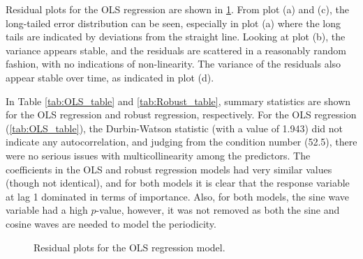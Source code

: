 \label{chapt:appendix_B}
Residual plots for the OLS regression are shown in \cref{fig:residuals_MLR}. From plot (a) and (c), the long-tailed error distribution can be seen, especially in plot (a) where the long tails are indicated by deviations from the straight line. Looking at plot (b), the variance appears stable, and the residuals are scattered in a reasonably random fashion, with no indications of non-linearity. The variance of the residuals also appear stable over time, as indicated in plot (d). 

In Table \ref{tab:OLS_table} and \ref{tab:Robust_table}, summary statistics are shown for the OLS regression and robust regression, respectively. For the OLS regression (\cref{tab:OLS_table}), the Durbin-Watson statistic (with a value of 1.943) did not indicate any autocorrelation, and judging from the condition number (52.5), there were no serious issues with multicollinearity among the predictors. The coefficients in the OLS and robust regression models had very similar values (though not identical), and for both models it is clear that the response variable at lag 1 dominated in terms of importance. Also, for both models, the sine wave variable had a high $p$-value, however, it was not removed as both the sine and cosine waves are needed to model the periodicity.   

\begin{figure}[h]
\centering
{}
\caption{Residual plots for the OLS regression model.}
\label{fig:residuals_MLR}
\end{figure}

